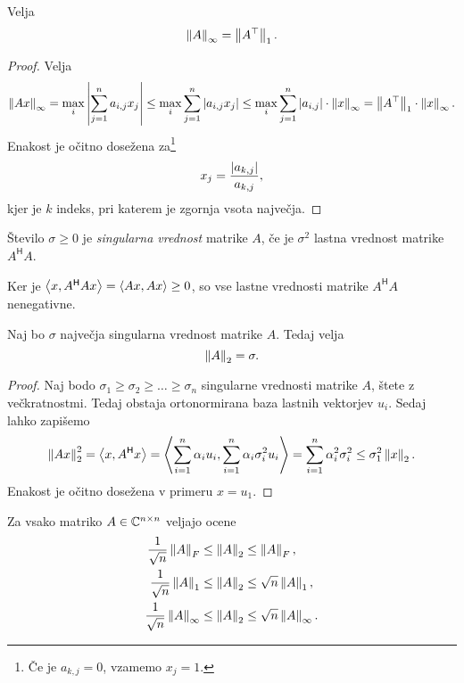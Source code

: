 \begin{trditev}
Velja
\[
\left\lVert A\right\rVert_\infty = \left\lVert A^\top\right\rVert_1.
\]
\end{trditev}

\begin{proof}
Velja
\[
\left\lVert Ax\right\rVert_\infty = \max_i \left\lvert \sum_{j=1}^n a_{i,j} x_j\right\rvert \leq
\max_{i} \sum_{j=1}^n \left\lvert a_{i,j} x_j\right\rvert \leq
\max_i \sum_{j=1}^n \left\lvert a_{i,j}\right\rvert \cdot \left\lVert x\right\rVert_\infty =
\left\lVert A^\top\right\rVert_1 \cdot \left\lVert x\right\rVert_\infty.
\]
Enakost je očitno dosežena za\footnote{Če je $a_{k,j} = 0$,
vzamemo $x_j = 1$.}
\[
x_j = \frac{\left\lvert a_{k,j}\right\rvert}{a_{k,j}},
\]
kjer je $k$ indeks, pri katerem je zgornja vsota največja.
\end{proof}

\begin{definicija}
Število $\sigma \geq 0$ je
\emph{singularna vrednost}
matrike $A$, če je $\sigma^2$ lastna vrednost matrike
$A^\mathsf{H} A$.
\end{definicija}

\begin{opomba}
Ker je $\left\langle x, A^\mathsf{H} Ax\right\rangle = \left\langle Ax, Ax\right\rangle \geq 0$, so vse
lastne vrednosti matrike $A^\mathsf{H} A$ nenegativne.
\end{opomba}

\begin{trditev}
Naj bo $\sigma$ največja singularna vrednost matrike $A$. Tedaj
velja
\[
\left\lVert A\right\rVert_2 = \sigma.
\]
\end{trditev}

\begin{proof}
Naj bodo $\sigma_1 \geq \sigma_2 \geq \dots \geq \sigma_n$
singularne vrednosti matrike $A$, štete z večkratnostmi. Tedaj
obstaja ortonormirana baza lastnih vektorjev $u_i$. Sedaj lahko
zapišemo
\[
\left\lVert Ax\right\rVert_2^2 =
\left\langle x, A^\mathsf{H} x\right\rangle =
\left\langle \sum_{i=1}^n \alpha_i u_i,
\sum_{i=1}^n \alpha_i \sigma_i^2 u_i\right\rangle =
\sum_{i=1}^n \alpha_i^2 \sigma_i^2 \leq
\sigma_1^2 \left\lVert x\right\rVert_2.
\]
Enakost je očitno dosežena v primeru $x = u_1$.
\end{proof}

\begin{trditev}
Za vsako matriko $A \in \mathbb{C}^{n \times n}$ veljajo ocene
\begin{align*}
\frac{1}{\sqrt{n}} \left\lVert A\right\rVert_F
&\leq \left\lVert A\right\rVert_2 \leq \left\lVert A\right\rVert_F,
\\
\frac{1}{\sqrt{n}} \left\lVert A\right\rVert_1
&\leq \left\lVert A\right\rVert_2 \leq \sqrt{n} \left\lVert A\right\rVert_1,
\\
\frac{1}{\sqrt{n}} \left\lVert A\right\rVert_\infty
&\leq \left\lVert A\right\rVert_2 \leq \sqrt{n} \left\lVert A\right\rVert_\infty.
\end{align*}
\end{trditev}

